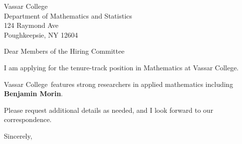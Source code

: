 




	
	
	\def\School{Vassar College}
	
	\begin{letter}
		{Vassar College\\
			Department of Mathematics and Statistics\\
			124 Raymond Ave\\
			Poughkeepsie, NY 12604
		}
		
		\opening{Dear Members of the Hiring Committee}
		
		
		I am applying for the tenure-track position in Mathematics at \School. 
		
		\School~features strong researchers in applied mathematics including \textbf{Benjamin Morin}. 
		
		
		
		
		
		Please request additional details as needed, and I look forward to our correspondence.
		
		\closing{Sincerely,}
	\end{letter}
